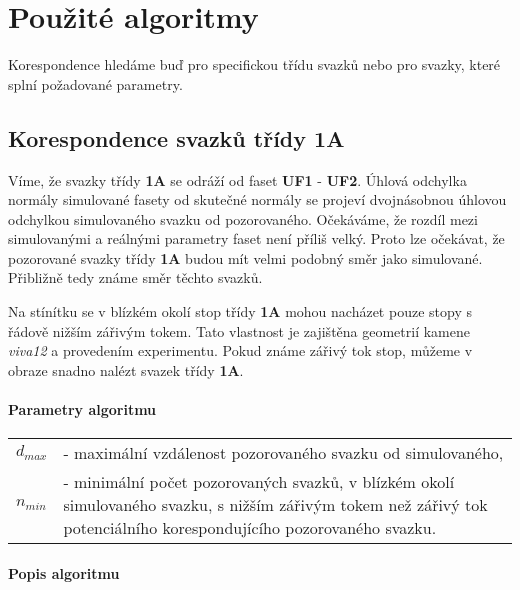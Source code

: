 	 

\section{Použité algoritmy}
	Korespondence hledáme buď pro specifickou třídu svazků nebo pro svazky, které splní požadované parametry. 

\subsection{Korespondence svazků třídy \textbf{1A}}
\label{sec: 1A}

Víme, že svazky třídy \textbf{1A} se odráží od faset \textbf{UF1} - \textbf{UF2}. Úhlová odchylka normály simulované fasety od  skutečné normály se projeví dvojnásobnou úhlovou odchylkou simulovaného svazku od pozorovaného. Očekáváme, že rozdíl mezi simulovanými a reálnými parametry faset není příliš velký. Proto lze očekávat, že pozorované svazky třídy \textbf{1A} budou mít velmi podobný směr jako simulované. Přibližně tedy známe směr těchto svazků.

Na stínítku se v blízkém okolí stop třídy \textbf{1A} mohou nacházet pouze stopy s řádově nižším zářivým tokem. Tato vlastnost je zajištěna geometrií kamene \textit{viva12} a provedením experimentu. Pokud známe zářivý tok stop, můžeme v obraze snadno nalézt svazek třídy \textbf{1A}. 

\paragraph{Parametry algoritmu}
\hspace{1mm}
	 
	 \begin{tabular}{l L{14cm}}
	 $d_{max}$ & - maximální vzdálenost pozorovaného svazku od simulovaného,\\
	 $n_{min}$ & - minimální počet pozorovaných svazků, v blízkém okolí simulovaného svazku, s nižším zářivým tokem než zářivý tok potenciálního korespondujícího pozorovaného svazku. \\
	 \end{tabular}
	
\paragraph{Popis algoritmu} 

